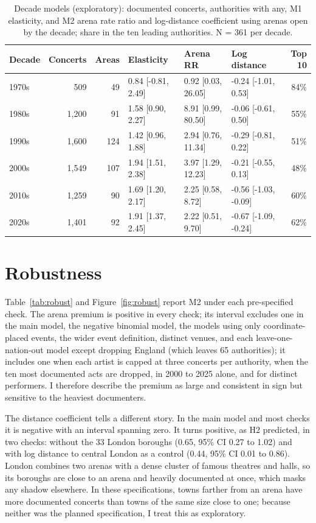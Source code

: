 \documentclass[11pt,a4paper]{article}
\begin{document}
\begin{table}[tbp]\centering\footnotesize\caption{Decade models (exploratory): documented concerts, authorities with any, M1 elasticity, and M2 arena rate ratio and log-distance coefficient using arenas open by the decade; share in the ten leading authorities. N = 361 per decade.}\label{tab:decades}\begin{tabular}{lrrlllr}\toprule Decade & Concerts & Areas & Elasticity & Arena RR & Log distance & Top 10\\\midrule
1970s & 509 & 49 & 0.84 [-0.81, 2.49] & 0.92 [0.03, 26.05] & -0.24 [-1.01, 0.53] & 84\%\\
1980s & 1,200 & 91 & 1.58 [0.90, 2.27] & 8.91 [0.99, 80.50] & -0.06 [-0.61, 0.50] & 55\%\\
1990s & 1,600 & 124 & 1.42 [0.96, 1.88] & 2.94 [0.76, 11.34] & -0.29 [-0.81, 0.22] & 51\%\\
2000s & 1,549 & 107 & 1.94 [1.51, 2.38] & 3.97 [1.29, 12.23] & -0.21 [-0.55, 0.13] & 48\%\\
2010s & 1,259 & 90 & 1.69 [1.20, 2.17] & 2.25 [0.58, 8.72] & -0.56 [-1.03, -0.09] & 60\%\\
2020s & 1,401 & 92 & 1.91 [1.37, 2.45] & 2.22 [0.51, 9.70] & -0.67 [-1.09, -0.24] & 62\%\\
\bottomrule\end{tabular}\end{table}

\section{Robustness}\label{sec:robust}
Table~\ref{tab:robust} and Figure~\ref{fig:robust} report M2 under each pre-specified check. The arena premium is positive in every check; its interval excludes one in the main model, the negative binomial model, the models using only coordinate-placed events, the wider event definition, distinct venues, and each leave-one-nation-out model except dropping England (which leaves 65 authorities); it includes one when each artist is capped at three concerts per authority, when the ten most documented acts are dropped, in 2000 to 2025 alone, and for distinct performers. I therefore describe the premium as large and consistent in sign but sensitive to the heaviest documenters.

The distance coefficient tells a different story. In the main model and most checks it is negative with an interval spanning zero. It turns positive, as H2 predicted, in two checks: without the 33 London boroughs (0.65, 95\% CI 0.27 to 1.02) and with log distance to central London as a control (0.44, 95\% CI 0.01 to 0.86). London combines two arenas with a dense cluster of famous theatres and halls, so its boroughs are close to an arena and heavily documented at once, which masks any shadow elsewhere. In these specifications, towns farther from an arena have more documented concerts than towns of the same size close to one; because neither was the planned specification, I treat this as exploratory.
\end{document}
